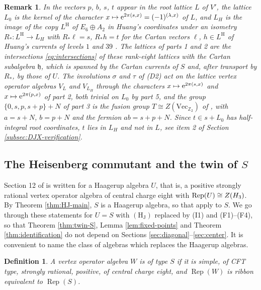 \documentclass[leqno]{article}
\let\cal\relax
\newcommand{\cal}{\mathcal}
\newcommand{\Z}{\ensuremath{\mathbb{Z}}}
\newcommand{\co}{\colon}
\let\i\relax
\newcommand{\i}{\mathrm{i}}
\newcommand{\e}{\mathrm{e}}
\DeclareMathOperator{\Rep}{Rep}
\newtheorem{defi}[thm]{Definition}
\newtheorem{remark}[thm]{Remark}
\numberwithin{equation}{section}
\begin{document}
\begin{remark}\normalfont
\label{rem:DJX-lattices}
In \cite[Section 5]{DJX26} the vectors $p$, $b$, $s$, $t$ appear in the root lattice $L$ of $V'$, the lattice $L_0$ is the kernel of the character $x \mapsto \e^{2\pi\i(s,x)} = (-1)^{(\lambda,x)}$ of $L$, and $L_H$ is the image of the copy $L^{\mathrm H}$ of $E_6 \oplus A_2$ in Huang's coordinates under an isometry $R_* \co L^{\mathrm H} \to L_H$ with $R_*\ell = s$, $R_*h = t$ for the Cartan vectors $\ell$, $h \in L^{\mathrm H}$ of Huang's currents of levels $1$ and $39$ \cite[Proposition 5.1 and (6.10)]{DJX26}. The lattices of parts 1 and 2 are the intersections \eqref{eq:intersections} of these rank-eight lattices with the Cartan subalgebra $\mathfrak h$, which is spanned by the Cartan currents of $S$ and, after transport by $R_*$, by those of $U$. The involutions $\sigma$ and $\tau$ of \textup{(D2)} act on the lattice vertex operator algebras $V_L$ and $V_{L_H}$ through the characters $x \mapsto \e^{2\pi\i(s,x)}$ and $x \mapsto \e^{2\pi\i(p,x)}$ of part 2, both trivial on $L_0$ by part 5, and the group $\{0,s,p,s+p\}+N$ of part 3 is the fusion group $T \cong Z(\mathrm{Vec}_{\Z_2})$ of \cite[Lemma 9.1]{DJX26}, with $a = s+N$, $b = p+N$ and the fermion $ab = s+p+N$. Since $t \in s+L_0$ has half-integral root coordinates, $t$ lies in $L_H$ and not in $L$, see item 2 of Section \ref{subsec:DJX-verification}.
\end{remark}


\subsection{The Heisenberg commutant and the twin of \texorpdfstring{$S$}{S}}
\label{subsec:twin}

Section 12 of \cite{Arh26} is written for a Haagerup algebra $U$, that is, a positive strongly rational vertex operator algebra of central charge eight with $\Rep(U) \cong Z(\cal H_3)$. By Theorem \ref{thm:HJ-main}, $S$ is a Haagerup algebra, so that \cite[Proposition 12.2 and Theorem 12.3]{Arh26} apply to $S$. We go through these statements for $U = S$ with $\mathrm{(H_J)}$ replaced by (I1) and (F1)--(F4), so that Theorem \ref{thm:twin-S}, Lemma \ref{lem:fixed-points} and Theorem \ref{thm:identification} do not depend on Sections \ref{sec:diagonal}--\ref{sec:center}. It is convenient to name the class of algebras which replaces the Haagerup algebras.

\begin{defi}
\label{def:type-S}
A vertex operator algebra $W$ is \emph{of type $S$} if it is simple, of CFT type, strongly rational, positive, of central charge eight, and $\Rep(W)$ is ribbon equivalent to $\Rep(S)$.
\end{defi}
\end{document}
